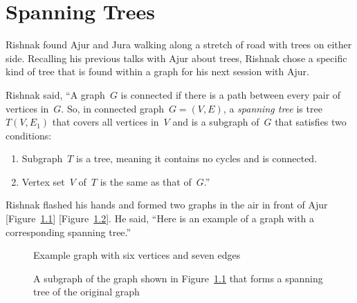 \chapter{Spanning Trees}
Rishnak found Ajur and Jura walking along a stretch of road with trees on either side. Recalling his previous talks with Ajur about trees, Rishnak chose a specific kind of tree that is found within a graph for his next session with Ajur.

Rishnak said, ``A graph~$G$ is connected if there is a path between every pair of vertices in~$G$. So, in connected graph~$G=(V,E)$, a \textit{spanning tree} is tree~$T(V,E_1)$ that covers all vertices in~$V$ and is a subgraph of~$G$ that satisfies two conditions:
\begin{enumerate}
    \item Subgraph~$T$ is a tree, meaning it contains no cycles and is connected.
    \item Vertex set~$V$ of~$T$ is the same as that of~$G$.''
\end{enumerate}

Rishnak flashed his hands and formed two graphs in the air in front of Ajur [Figure~\ref{11g1}] [Figure~\ref{11g2}]. He said, ``Here is an example of a graph with a corresponding spanning tree.''

\begin{figure}
\begin{center}
\caption{Example graph with six vertices and seven edges}\label{11g1}
\end{center}
\end{figure}

\begin{figure}
\begin{center}
\caption{A subgraph of the graph shown in Figure~\ref{11g1} that forms a spanning tree of the original graph}\label{11g2}
\end{center}
\end{figure}

